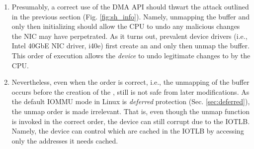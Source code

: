 \begin{enumerate}[label=(\roman*)]

\item Presumably, a correct use of the DMA API should thwart the attack outlined in the previous section (Fig. \ref{fig:sh_info}). Namely, unmapping the buffer and only then initializing \shinfo{} should allow the CPU to undo any malicious changes the NIC may have perpetrated. 
As it turns out, prevalent device drivers (i.e., Intel 40GbE NIC driver, i40e) first create an \skb{} and only then unmap the buffer. This order of execution allows the \emph{device} to undo legitimate changes to \shinfo{} by the CPU. 

\item Nevertheless, even when the order is correct, i.e., the unmapping of the buffer occurs before the creation of the \skb{}, still \shinfo{} is not safe from later modifications. As the default IOMMU mode in Linux is \emph{deferred} protection (Sec. \ref{sec:deferred}), the unmap order is made irrelevant. That is, even though the unmap function is invoked in the correct order, the device can still corrupt \shinfo{} due to the IOTLB. Namely, the device can control which \iova{} are cached in the IOTLB by accessing only the addresses it needs cached. 


\end{enumerate}
